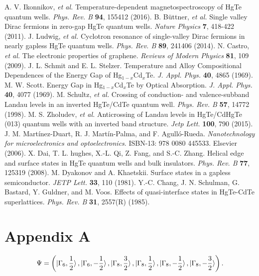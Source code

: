\documentclass[titlepage,a4paper]{book}
\begin{document}
\begin{thebibliography}{199}
A. V. Ikonnikov, \textit{et al.} Temperature-dependent magnetospectroscopy of HgTe quantum wells. \textit{Phys. Rev. B} \textbf{94}, 155412 (2016).
B. Büttner, \textit{et al.} Single valley Dirac fermions in zero-gap HgTe quantum wells. \textit{Nature Physics} \textbf{7}, 418-422 (2011).
J. Ludwig, \textit{et al.} Cyclotron resonance of single-valley Dirac fermions in nearly gapless HgTe quantum wells. \textit{Phys. Rev. B} \textbf{89}, 241406 (2014).
N. Castro, \textit{et al.} The electronic properties of graphene. \textit{Reviews of Modern Physics} \textbf{81}, 109 (2009).
J. L. Schmit and E. L. Stelzer. Temperature and Alloy Compositional Dependences of the Energy Gap of Hg$_{1-x}$Cd$_x$Te. \textit{J. Appl. Phys.} \textbf{40}, 4865 (1969).
M. W. Scott. Energy Gap in Hg$_{1-x}$Cd$_x$Te by Optical Absorption. \textit{J. Appl. Phys.} \textbf{40}, 4077 (1969).
M. Schultz, \textit{et al.} Crossing of conduction- and valence-subband Landau levels in an inverted HgTe/CdTe quantum well. \textit{Phys. Rev. B} \textbf{57}, 14772 (1998).
M. S. Zholudev, \textit{et al.} Anticrossing of Landau levels in HgTe/CdHgTe (013) quantum wells with an inverted band structure. \textit{Jetp Lett.} \textbf{100}, 790 (2015).
J. M. Martínez-Duart, R. J. Martín-Palma, and F. Agulló-Rueda. \textit{Nanotechnology for microelectronics and optoelectronics}. ISBN-13: 978 0080 445533. Elsevier (2006).
X. Dai, T. L. hughes, X.-L. Qi, Z. Fang, and S.-C. Zhang. Helical edge and surface states in HgTe quantum wells and bulk insulators. \textit{Phys. Rev. B} \textbf{77}, 125319 (2008). 
M. Dyakonov and A. Khaetskii. Surface states in a gapless semiconductor. \textit{JETP Lett.} \textbf{33}, 110 (1981).
Y.-C. Chang, J. N. Schulman, G. Bastard, Y. Guldner, and M. Voos. Effects of quasi-interface states in HgTe-CdTe superlattices. \textit{Phys. Rev. B} \textbf{31}, 2557(R) (1985).

\end{thebibliography}

\appendix
\chapter{Appendix A}

\begin{equation}
\label{1}
\Psi = \left( \ket{\Gamma_6, \frac{1}{2}}, \ket{\Gamma_6, -\frac{1}{2}}, \ket{\Gamma_8, \frac{3}{2}}, \ket{\Gamma_8, \frac{1}{2}}, \ket{\Gamma_8, -\frac{1}{2}}, \ket{\Gamma_8, -\frac{3}{2}}  \right).
\end{equation}
\end{document}
